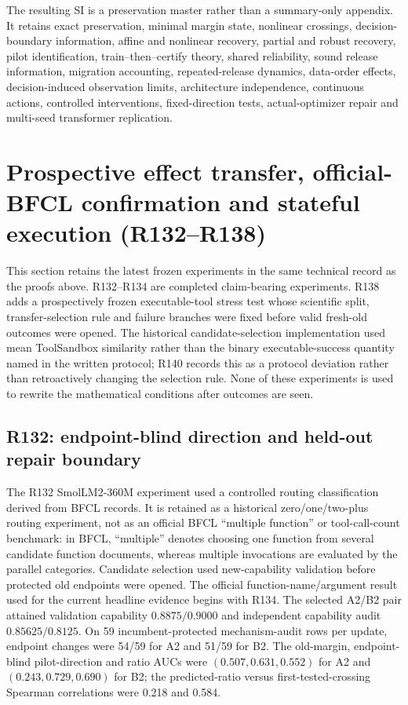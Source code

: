 \documentclass[11pt,letterpaper]{article}
\theoremstyle{plain}
\newcommand{\1}{\mathbf 1}
\begin{document}
The resulting SI is a preservation master rather than a summary-only appendix. It retains exact preservation, minimal margin state, nonlinear crossings, decision-boundary information, affine and nonlinear recovery, partial and robust recovery, pilot identification, train--then--certify theory, shared reliability, sound release information, migration accounting, repeated-release dynamics, data-order effects, decision-induced observation limits, architecture independence, continuous actions, controlled interventions, fixed-direction tests, actual-optimizer repair and multi-seed transformer replication.


\clearpage
\section{Prospective effect transfer, official-BFCL confirmation and stateful execution (R132--R138)}
\label{sec:r137_latest}
This section retains the latest frozen experiments in the same technical record as the proofs above. R132--R134 are completed claim-bearing experiments. R138 adds a prospectively frozen executable-tool stress test whose scientific split, transfer-selection rule and failure branches were fixed before valid fresh-old outcomes were opened. The historical candidate-selection implementation used mean ToolSandbox similarity rather than the binary executable-success quantity named in the written protocol; R140 records this as a protocol deviation rather than retroactively changing the selection rule. None of these experiments is used to rewrite the mathematical conditions after outcomes are seen.

\subsection{R132: endpoint-blind direction and held-out repair boundary}
The R132 SmolLM2-360M experiment used a controlled routing classification derived from BFCL records. It is retained as a historical zero/one/two-plus routing experiment, not as an official BFCL ``multiple function'' or tool-call-count benchmark: in BFCL, ``multiple'' denotes choosing one function from several candidate function documents, whereas multiple invocations are evaluated by the parallel categories. Candidate selection used new-capability validation before protected old endpoints were opened. The official function-name/argument result used for the current headline evidence begins with R134. The selected A2/B2 pair attained validation capability $0.8875/0.9000$ and independent capability audit $0.85625/0.8125$. On 59 incumbent-protected mechanism-audit rows per update, endpoint changes were 54/59 for A2 and 51/59 for B2. The old-margin, endpoint-blind pilot-direction and ratio AUCs were $(0.507,0.631,0.552)$ for A2 and $(0.243,0.729,0.690)$ for B2; the predicted-ratio versus first-tested-crossing Spearman correlations were 0.218 and 0.584.
\end{document}
